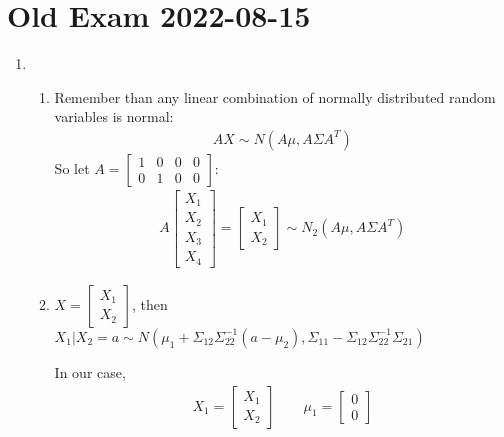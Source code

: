 \section{Old Exam 2022-08-15}
\begin{enumerate}[label=\arabic*.,leftmargin=*]
  \item\par\bigskip
    \begin{enumerate}[label=\alph*),leftmargin=*]
      \item Remember than any linear combination of normally distributed random variables is normal:
        \begin{equation*}
          \begin{gathered}
            AX\sim N(A\mu,A\Sigma A^T)
          \end{gathered}
        \end{equation*}
        So let $A = \begin{bmatrix}1&0&0&0\\0&1&0&0\end{bmatrix}$:
        \begin{equation*}
          \begin{gathered}
            A\begin{bmatrix}X_1\\X_2\\X_3\\X_4\end{bmatrix} = \begin{bmatrix}X_1\\X_2\end{bmatrix}\sim N_2(A\mu,A\Sigma A^T)
          \end{gathered}
        \end{equation*}
        \par\bigskip
      \item $X = \begin{bmatrix}X_1\\X_2\end{bmatrix}$, then $X_1|X_2 = a\sim N(\mu_1+\Sigma_{12}\Sigma_{22}^{-1}(a-\mu_2), \Sigma_{11}-\Sigma_{12}\Sigma_{22}^{-1}\Sigma_{21})$
        \par\bigskip
        \noindent In our case,
        \begin{equation*}
          \begin{gathered}
            X_1 = \begin{bmatrix}X_1\\X_2\end{bmatrix}\qquad \mu_1 = \begin{bmatrix}0\\0\end{bmatrix}\\

\end{gathered}
\end{equation*}
\end{enumerate}
\end{enumerate}
